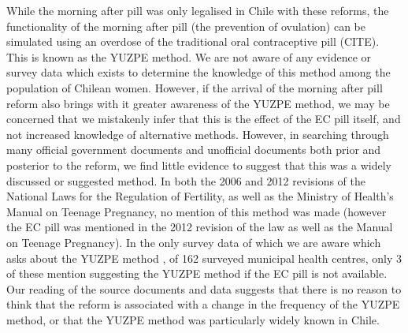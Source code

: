 \documentclass[11pt,subeqn]{article}
\begin{document}
\begin{spacing}{1.4}
While the morning after pill was only legalised in Chile with these reforms,
the functionality of the morning after pill (the prevention of ovulation) can
be simulated using an overdose of the traditional oral contraceptive pill 
(CITE). This is known as the YUZPE method.  We are not aware of any evidence
or survey data which exists to determine the knowledge of this method among the 
population of Chilean women.  However, if the arrival of the morning after pill
reform also brings with it greater awareness of the YUZPE method, we may be
concerned that we mistakenly infer that this is the effect of the EC pill itself,
and not increased knowledge of alternative methods.  However, in searching 
through many official government documents and unofficial documents both prior 
and posterior to the reform, we find little evidence to suggest that this was
a widely discussed or suggested method.  In both the 2006 and 2012 revisions of
the National Laws for the Regulation of Fertility, as well as the Ministry of 
Health's Manual on Teenage Pregnancy, no mention of this method was made (however 
the EC pill was mentioned in the 2012 revision of the law as well as the Manual
on Teenage Pregnancy).  In the only survey data of which we are aware which asks 
about the YUZPE method \citep{Didesetal2010}, of 162 surveyed municipal health 
centres, only 3 of these mention suggesting the YUZPE method if the EC pill is 
not available.  Our reading of the source documents and data suggests that there 
is no reason to think that the reform is associated with a change in the 
frequency of the YUZPE method, or that the YUZPE method was particularly widely 
known in Chile.


\end{spacing}
\end{document}
